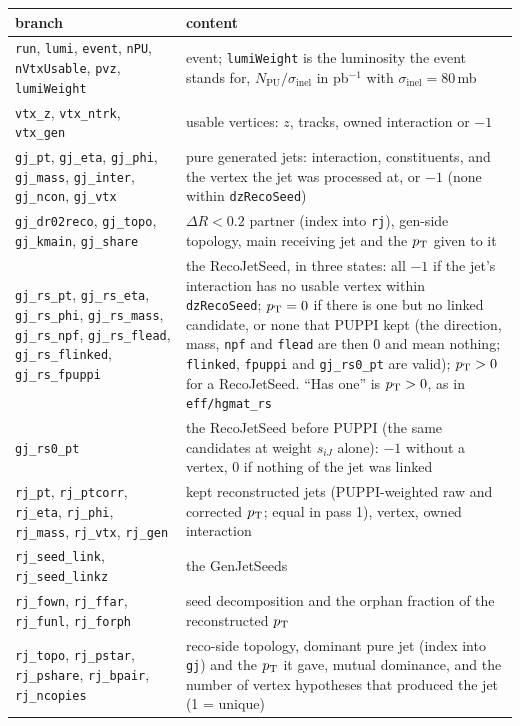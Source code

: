 \begin{center}\small
\begin{tabular}{>{\raggedright\arraybackslash}p{5.6cm}>{\raggedright\arraybackslash}p{10.1cm}}
\toprule
branch & content \\
\midrule
\texttt{run}, \texttt{lumi}, \texttt{event}, \texttt{nPU}, \texttt{nVtxUsable}, \texttt{pvz}, \texttt{lumiWeight} &
  event; \texttt{lumiWeight} is the luminosity the event stands for, $N_{\mathrm{PU}}/\sigma_{\mathrm{inel}}$ in
  pb$^{-1}$ with $\sigma_{\mathrm{inel}} = 80$\,mb \\
\texttt{vtx\_z}, \texttt{vtx\_ntrk}, \texttt{vtx\_gen} & usable vertices: $z$, tracks, owned interaction or $-1$ \\
\texttt{gj\_pt}, \texttt{gj\_eta}, \texttt{gj\_phi}, \texttt{gj\_mass}, \texttt{gj\_inter}, \texttt{gj\_ncon},
\texttt{gj\_vtx} & pure generated jets: interaction, constituents, and the vertex the jet was processed at, or
  $-1$ (none within \texttt{dzRecoSeed}) \\
\texttt{gj\_dr02reco}, \texttt{gj\_topo}, \texttt{gj\_kmain}, \texttt{gj\_share} & $\Delta R<0.2$ partner (index
  into \texttt{rj}), gen-side topology, main receiving jet and the $p_{\mathrm{T}}$ given to it \\
\texttt{gj\_rs\_pt}, \texttt{gj\_rs\_eta}, \texttt{gj\_rs\_phi}, \texttt{gj\_rs\_mass}, \texttt{gj\_rs\_npf},
\texttt{gj\_rs\_flead}, \texttt{gj\_rs\_flinked}, \texttt{gj\_rs\_fpuppi} & the RecoJetSeed, in three states:
  all $-1$ if the jet's interaction has no usable vertex within \texttt{dzRecoSeed}; $p_{\mathrm{T}} = 0$ if there is one
  but no linked candidate, or none that PUPPI kept (the direction, mass, \texttt{npf} and \texttt{flead} are then 0
  and mean nothing; \texttt{flinked}, \texttt{fpuppi} and \texttt{gj\_rs0\_pt} are valid); $p_{\mathrm{T}} > 0$ for a
  RecoJetSeed. ``Has one'' is $p_{\mathrm{T}} > 0$, as in \texttt{eff/hgmat\_rs} \\
\texttt{gj\_rs0\_pt} & the RecoJetSeed before PUPPI (the same candidates at weight $s_{iJ}$ alone): $-1$ without
  a vertex, 0 if nothing of the jet was linked \\
\texttt{rj\_pt}, \texttt{rj\_ptcorr}, \texttt{rj\_eta}, \texttt{rj\_phi}, \texttt{rj\_mass}, \texttt{rj\_vtx},
\texttt{rj\_gen} & kept reconstructed jets (PUPPI-weighted raw and corrected $p_{\mathrm{T}}$; equal in pass 1), vertex,
  owned interaction \\
\texttt{rj\_seed\_link}, \texttt{rj\_seed\_linkz} & the GenJetSeeds \\
\texttt{rj\_fown}, \texttt{rj\_ffar}, \texttt{rj\_funl}, \texttt{rj\_forph} & seed decomposition and the orphan
  fraction of the reconstructed $p_{\mathrm{T}}$ \\
\texttt{rj\_topo}, \texttt{rj\_pstar}, \texttt{rj\_pshare}, \texttt{rj\_bpair}, \texttt{rj\_ncopies} &
  reco-side topology, dominant pure jet (index into \texttt{gj}) and the $p_{\mathrm{T}}$ it gave, mutual dominance, and
  the number of vertex hypotheses that produced the jet (1 = unique) \\
\bottomrule
\end{tabular}
\end{center}


